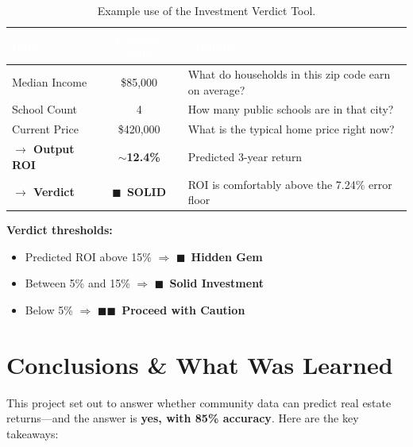 \documentclass[12pt, a4paper]{article}
\newcommand{\good}{\textcolor{solidgreen}{$\blacksquare$}}
\newcommand{\caution}{\textcolor{cautionamber}{$\blacksquare\blacksquare$}}
\newcommand{\hrow}{\rowcolor{rowblue}}
\begin{document}
\begin{table}[H]
\centering
\renewcommand{\arraystretch}{1.4}
\begin{tabular}{lcl}
\toprule
\rowcolor{headerblue}
\textcolor{white}{\textbf{Input}} &
\textcolor{white}{\textbf{Example Value}} &
\textcolor{white}{\textbf{Meaning}} \\
\midrule
Median Income  & \$85,000  & What do households in this zip code earn on average? \\
\hrow School Count   & 4         & How many public schools are in that city? \\
Current Price  & \$420,000 & What is the typical home price right now? \\
\midrule
\textbf{$\rightarrow$ Output ROI}  & \textbf{$\sim$12.4\%} & Predicted 3-year return \\
\hrow \textbf{$\rightarrow$ Verdict}     & \good\ \textbf{SOLID}  & ROI is comfortably above the 7.24\% error floor \\
\bottomrule
\end{tabular}
\caption{Example use of the Investment Verdict Tool.}
\end{table}

\textbf{Verdict thresholds:}
\begin{itemize}[nosep]
    \item Predicted ROI above 15\% \; $\Rightarrow$ \; \good\ \textbf{Hidden Gem}
    \item Between 5\% and 15\% \; $\Rightarrow$ \; \good\ \textbf{Solid Investment}
    \item Below 5\% \; $\Rightarrow$ \; \caution\ \textbf{Proceed with Caution}
\end{itemize}

\section{Conclusions \& What Was Learned}

This project set out to answer whether community data can predict real estate returns---and the answer is
\textbf{yes, with 85\% accuracy}. Here are the key takeaways:
\end{document}
